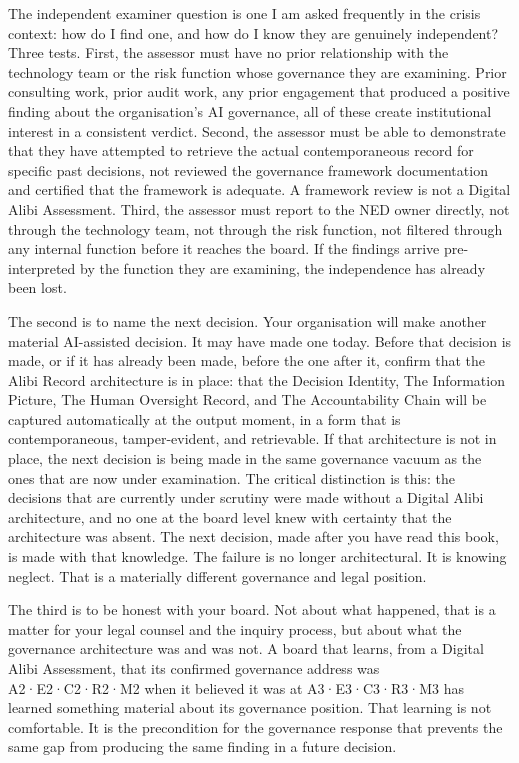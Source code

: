 The independent examiner question is one I am asked frequently in the crisis context: how do I find one, and how do I know they are genuinely independent? Three tests. First, the assessor must have no prior relationship with the technology team or the risk function whose governance they are examining. Prior consulting work, prior audit work, any prior engagement that produced a positive finding about the organisation's AI governance, all of these create institutional interest in a consistent verdict. Second, the assessor must be able to demonstrate that they have attempted to retrieve the actual contemporaneous record for specific past decisions, not reviewed the governance framework documentation and certified that the framework is adequate. A framework review is not a Digital Alibi Assessment. Third, the assessor must report to the NED owner directly, not through the technology team, not through the risk function, not filtered through any internal function before it reaches the board. If the findings arrive pre-interpreted by the function they are examining, the independence has already been lost.

The second is to name the next decision. Your organisation will make another material AI-assisted decision. It may have made one today. Before that decision is made, or if it has already been made, before the one after it, confirm that the Alibi Record architecture is in place: that the Decision Identity, The Information Picture, The Human Oversight Record, and The Accountability Chain will be captured automatically at the output moment, in a form that is contemporaneous, tamper-evident, and retrievable. If that architecture is not in place, the next decision is being made in the same governance vacuum as the ones that are now under examination. The critical distinction is this: the decisions that are currently under scrutiny were made without a Digital Alibi architecture, and no one at the board level knew with certainty that the architecture was absent. The next decision, made after you have read this book, is made with that knowledge. The failure is no longer architectural. It is knowing neglect. That is a materially different governance and legal position.

The third is to be honest with your board. Not about what happened, that is a matter for your legal counsel and the inquiry process, but about what the governance architecture was and was not. A board that learns, from a Digital Alibi Assessment, that its confirmed governance address was A2·E2·C2·R2·M2 when it believed it was at A3·E3·C3·R3·M3 has learned something material about its governance position. That learning is not comfortable. It is the precondition for the governance response that prevents the same gap from producing the same finding in a future decision.

